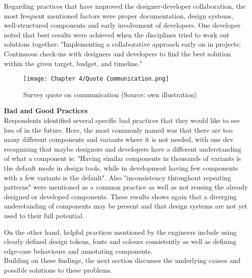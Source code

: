 Regarding practices that have improved the designer-developer collaboration, the most frequent
mentioned factors were proper documentation, design systems, well-structured components and early
involvement of developers. One developer noted that best results were achieved when the disciplines
tried to work out solutions together:
"Implementing a collaborative approach early on in projects: Continuous check-ins with designers and
developers to find the best solution within the given target, budget, and timeline."

\begin{figure}[H]
    \centering
    \texttt{[image: Chapter 4/Quote Communication.png]}
    \caption{Survey quote on communication (Source: own illustration)}
\end{figure}

\textbf{Bad and Good Practices}\\
Respondents identified several specific bad practices that they would like to see less of in the
future. Here, the most commonly named was that there are too many different components and variants
where it is not needed, with one dev recognizing that maybe designers and developers have a
different understanding of what a component is: "Having similar components in thousands of variants
is the default mode in design tools, while in development having few components with a few variants
is the default". Also "inconsistency throughout repeating patterns" were mentioned as a common
practice as well as not reusing the already designed or developed components. These results shows
again that a diverging understanding of components may be present and that design systems are not
yet used to their full potential.

On the other hand, helpful practices mentioned by the engineers include using clearly defined design
tokens, fonts and colours consistently as well as defining edge-case behaviours and annotating
components. \\

Building on these findings, the next section discusses the underlying causes and possible solutions
to these problems.

